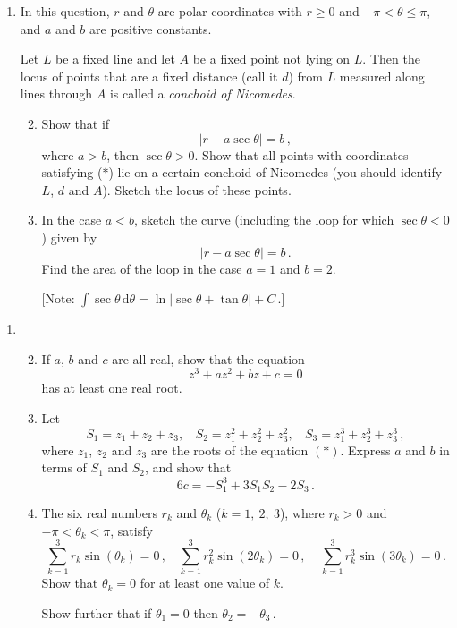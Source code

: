 \documentclass[a4, 11pt]{report}
\newlength{\qspace}
\newcounter{qnumber}
\newenvironment{question}%
 {\vspace{\qspace}
  \begin{enumerate}[\bfseries 1\quad][10]%
    \setcounter{enumi}{\value{qnumber}}%
    \item%
 }
{
  \end{enumerate}
  \filbreak
  \stepcounter{qnumber}
 }
\newenvironment{questionparts}[1][1]%
 {
  \begin{enumerate}[\bfseries (i)]%
    \setcounter{enumii}{#1}
    \addtocounter{enumii}{-1}
    \setlength{\itemsep}{5mm}
    \setlength{\parskip}{8pt}
 }
 {
  \end{enumerate}
 }
\def\d{{\mathrm d}}
\def\le{\leqslant}
\def\ge{\geqslant}
\renewcommand{\.}[1]{\ensuremath{\mathrm{#1}}}
\newcommand{\+}[1]{\ensuremath{\mathbf{#1}}}
\begin{document}
\begin{question}
In this question, $r$ and $\theta$ are polar coordinates with $r \ge0$ and  $- \pi <\theta\le  \pi$,  and $a$ and $b$ are positive constants. 

Let $L$ be a fixed line and let $A$ be a fixed point not lying on $L$. Then  the locus of points that are a fixed distance (call it $d$) from $L$ measured along lines through $A$ is called a {\em conchoid of Nicomedes}.

\begin{questionparts}
\item Show that if
\[
\vert r- a \sec\theta \vert = b\,,
\tag{$*$}
\]
where $a>b$, then $\sec\theta >0$.   Show that all points with coordinates satisfying ($*$) lie on a certain conchoid of Nicomedes (you  should identify  $L$, $d$ and $A$). Sketch the locus of these points.

\item In the case $a<b$, sketch the curve (including the loop for which $\sec\theta<0$) given by 
\[
\vert r- a \sec\theta \vert = b\,
.
\]
Find the area of the loop in the case $a=1$ and $b=2$.  
                             
[Note: 
$
\int \! \sec\theta \,\d \theta = \ln \vert \sec\theta + \tan\theta \vert + C
\,.
$]

\end{questionparts}\end{question}

\begin{question}
\begin{questionparts}
\item If $a$, $b$ and $c$ are all real, show that the equation
\[
z^3+az^2+bz+c=0
\tag{$*$}
\]
has at least one real root.

\item Let
\[
S_1= z_1+z_2+z_3, \ \ \ \
S_2= z_1^2 + z_2^2 + z_3^2, \ \ \ \ 
S_3= z_1^3 + z_2^3 + z_3^3\,,
\]
where $z_1$, $z_2$ and $z_3$ are the roots of the equation  $(*)$. Express $a$ and  $b$ in terms of $S_1$ and  $S_2$, and  show that 
\[
6c =- S_1^3 + 3 S_1S_2 - 2S_3\,.
\]
\item The six real numbers $r_k$ and $\theta_k$ ($k=1, \ 2, \ 3$), where $r_k>0$ and $-\pi < \theta_k <\pi$, satisfy
\[
\textstyle \sum\limits _{k=1}^3 r_k \sin (\theta_k) = 0\,,
\ \ \ \  
\textstyle \sum\limits _{k=1}^3 r_k^2 \sin (2\theta_k) = 0\,, 
\ \ \ \ \
\textstyle \sum\limits _{k=1}^3 r_k^3 \sin (3\theta_k) = 0\, .
\]
Show that  $\theta_k=0$ for at least one value of $k$. 

Show further that if $\theta_1=0$ then $\theta_2 = - \theta_3\,$.

\end{questionparts}
\end{question}
\end{document}
